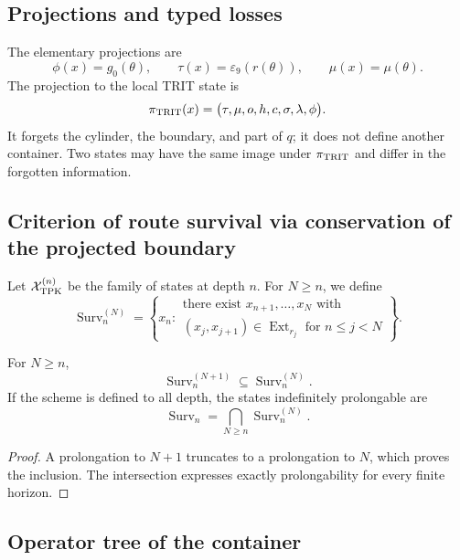 {\subsection{Projections and typed losses}

The elementary projections are
\[
 \phi(x)=g_0(\theta),
 \qquad
 \tau(x)=\varepsilon_9(r(\theta)),
 \qquad
 \mu(x)=\mu(\theta).
\]
The projection to the local TRIT state is
\[
 \pi_{\rm TRIT}(x)
 =\bigl(\tau,\mu,o,h,c,\sigma,\lambda,\phi\bigr).
\]
It forgets the cylinder, the boundary, and part of \(q\); it does not define another container.
Two states may have the same image under \(\pi_{\rm TRIT}\) and differ
in the forgotten information.

\subsection{Criterion of route survival via conservation of the projected boundary}

Let \(\mathcal X_{\rm TPK}^{(n)}\) be the family of states at depth
\(n\). For \(N\geq n\), we define
\[
 \operatorname{Surv}_n^{(N)}=
 \left\{x_n:
 \begin{array}{l}
 \text{there exist }x_{n+1},\ldots,x_N\text{ with}\\
 (x_j,x_{j+1})\in\operatorname{Ext}_{r_j}
 \text{ for }n\leq j<N
 \end{array}\right\}.
\]

\begin{proposition}
\label{p12-83-c1-s3:prop:tpk-filtracion-supervivencia}
For \(N\geq n\),
\[
 \operatorname{Surv}_n^{(N+1)}
 \subseteq
 \operatorname{Surv}_n^{(N)}.
\]
If the scheme is defined to all depth, the states
indefinitely prolongable are
\[
 \operatorname{Surv}_n
 =\bigcap_{N\geq n}\operatorname{Surv}_n^{(N)}.
\]
\end{proposition}

\begin{proof}
A prolongation to \(N+1\) truncates to a prolongation to \(N\),
which proves the inclusion. The intersection expresses exactly
prolongability for every finite horizon.
\end{proof}

\subsection{Operator tree of the container}

}

